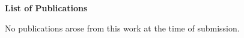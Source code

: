 \cleardoublepage
{}
{}
\pagestyle{plain}
\vfill
\begin{center}{\huge{\textbf{List of Publications}} \par}\end{center}
\vfill
No publications arose from this work at the time of submission.

\vfill\vfill\vfill\vfill\vfill\vfill\null
\clearpage